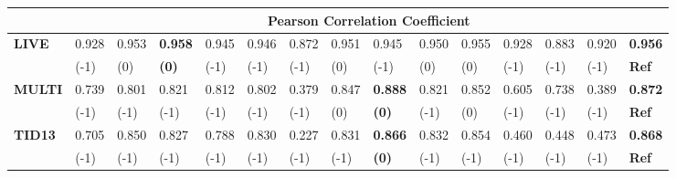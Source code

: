 \documentclass[draftcls,12pt, onecolumn]{IEEEtran}
\begin{document}
\begin{center}
\begin{table*}[htbp!]
\begin{tabular}{p{0.9cm}|p{0.63cm}|p{0.63cm}|p{0.63cm}|p{0.63cm}|p{0.63cm}|p{0.63cm}|p{0.63cm}|p{0.60cm}|p{0.75cm}|p{0.75cm}|p{0.63cm}|p{0.63cm}|p{0.63cm}|p{0.9cm}}
               & \multicolumn{14}{c}{\textbf{Pearson Correlation Coefficient}}                                                                                                                                                                        \\ \hline

\multirow{2}{*}{{\bf LIVE}}                 & 0.928             &0.953                  &\bf 0.958                  &0.945           &0.946                   &0.872                  & 0.951               &0.945                                &0.950             & 0.955       &0.928    &  0.883  &0.920   & \bf 0.956                   \\
 &  (-1)             &               (0) &\bf  (0)                  & (-1)               & (-1)                  &  (-1)                 &   (0)                & (-1) & (0)               &  (0)        & (-1)    & (-1)   &(-1) & \bf Ref           \\ 
               
         


\multirow{2}{*}{{\bf MULTI}}               &0.739                &0.801                   &0.821                   &              0.812 & 0.802               &0.379                 &0.847                &\bf 0.888                                & 0.821               &  0.852           &0.605   &0.738 &0.389 &\bf 0.872                      \\
 &(-1)               &(-1)                  & (-1)                   &              (-1) & (-1)                 &(-1)                  &(0)                 &\bf                                (0) & (-1)               &  (0)        & (-1)  &(-1)  & (-1)  &\bf Ref              \\  




\multirow{2}{*}{{\bf TID13}}       &0.705                & 0.850                  &0.827                    &0.788         &0.830                 &0.227                  &0.831                 &\bf 0.866            &0.832                              & 0.854       &0.460 &0.448   &0.473     &\bf 0.868                            \\&(-1)               & (-1)                 & (-1)                   & (-1)        & (-1)                &(-1)                 & (-1)                  &\bf                (0) & (-1)                              &  (-1)          &(-1)   &(-1) &(-1)  &\bf Ref              \\ \hline 





\end{tabular}
\end{table*}
\end{center}
\end{document}
